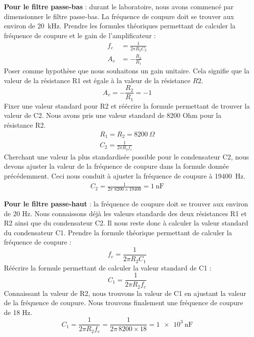 \documentclass[10pt, oneside, a4paper]{article}
\begin{document}
\noindent\textbf{Pour le filtre passe-bas} : durant le laboratoire, nous avons commencé par
dimensionner le filtre passe-bas.
La fréquence de coupure doit se trouver aux environ de \SI{20}{\kilo\hertz}.
Prendre les formules théoriques permettant de calculer la fréquence de coupure
et le gain de l'amplificateur :
\begin{align}
    f_c &= \frac{1}{2\pi R_2 C_2} \\[2mm]
    A_v &= -\frac{R_2}{R_1}
\end{align}
Poser comme hypothèse que nous souhaitons un gain unitaire.
Cela signifie que la valeur de la résistance R1 est égale à la valeur
de la résistance $R2$.
\begin{equation}
    A_v = - \frac{R_2}{R_1} = -1
\end{equation}
Fixer une valeur standard pour R2 et réécrire la formule permettant de trouver
la valeur de C2.
Nous avons pris une valeur standard de 8200 Ohm pour la résistance R2.
\begin{gather}
    R_1 = R_2 = \SI{8200}{\Omega} \\
    C_2 = \frac{1}{2\pi R_2 f_c}
\end{gather}
Cherchant une valeur la plus standardisée possible pour le condensateur C2, nous
devons ajuster la valeur de la fréquence de coupure dans la formule donnée précédemment.
Ceci nous conduit à ajuster la fréquence de coupure à \SI{19400}{\hertz}.
\begin{gather}
    C_2 = \frac{1}{2\pi\;8200\times19400} = \SI{1}{\nano\farad}
\end{gather}

\noindent\textbf{Pour le filtre passe-haut} : la fréquence de coupure doit se trouver aux environ
de 20 Hz.
Nous connaissons déjà les valeurs standards des deux résistances R1 et R2 ainsi que
du condensateur C2.
Il nous reste donc à calculer la valeur standard du condensateur C1.
Prendre la formule théorique permettant de calculer la fréquence de coupure :
\begin{equation}
    f_c = \frac{1}{2\pi R_2 C_1}
\end{equation}
Réécrire la formule permettant de calculer la valeur standard de C1 :
\begin{equation}
    C_1 = \frac{1}{2\pi R_2 f_c}
\end{equation}
Connaissant la valeur de R2, nous trouvons la valeur de C1 en ajustant la valeur
de la fréquence de coupure.
Nous trouvons finalement une fréquence de coupure de 18 Hz.
\begin{equation}
    C_1 = \frac{1}{2\pi R_2 f_c} = \frac{1}{2\pi\,8200\times18} = \SI{1e3}{\nano\farad}
\end{equation}
\end{document}
